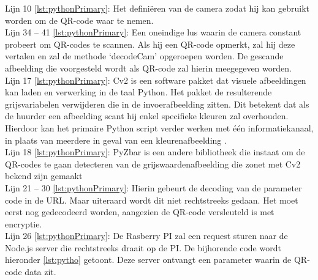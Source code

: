 \begin{enumerate}
\begin{lstlisting}[language=Python, caption={Het primaire uitvoerbare script van de QR-unit.}, label={lst:pythonPrimary}, numbers=left]
    \end{lstlisting}
    Lijn 10 \ref{lst:pythonPrimary}: Het definiëren van de camera zodat hij kan gebruikt worden om de QR-code waar te nemen. \\
    Lijn 34 – 41 \ref{lst:pythonPrimary}: Een oneindige lus waarin de camera constant probeert om QR-codes te scannen. Als hij een QR-code opmerkt, zal hij deze vertalen en zal de methode ‘decodeCam’ opgeroepen worden. De gescande afbeelding die voorgesteld wordt als QR-code zal hierin meegegeven worden.\\
    Lijn 17 \ref{lst:pythonPrimary}: Cv2 is een software pakket dat visuele afbeeldingen kan laden en verwerking in de taal Python. Het pakket de resulterende grijsvariabelen verwijderen die in de invoerafbeelding zitten. Dit betekent dat als de huurder een afbeelding scant hij enkel specifieke kleuren zal overhouden. Hierdoor kan het primaire Python script verder werken met één informatiekanaal, in plaats van meerdere in geval van een kleurenafbeelding \autocite{developmentteam}.\\
    Lijn 18 \ref{lst:pythonPrimary}: PyZbar is een andere bibliotheek die instaat om de QR-codes te gaan detecteren van de grijswaardenafbeelding die zonet met Cv2 bekend zijn gemaakt \autocite{Huang2022}\\
    Lijn 21 – 30 \ref{lst:pythonPrimary}: Hierin gebeurt de decoding van de parameter code in de URL. Maar uiteraard wordt dit niet rechtstreeks gedaan. Het moet eerst nog gedecodeerd worden, aangezien de QR-code versleuteld is met encryptie. \\
    Lijn 26 \ref{lst:pythonPrimary}: De Rasberry PI zal een request sturen naar de Node.js server die rechtstreeks draait op de PI. De bijhorende code wordt hieronder \ref{lst:pytho} getoont. Deze server ontvangt een parameter waarin de QR-code data zit.\\
    

\end{enumerate}
